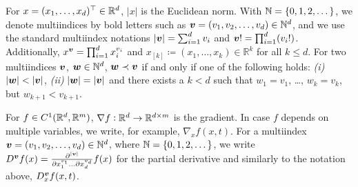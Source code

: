   For $x=(x_1,\dots,x_d)^\top\in\mathbb{R}^d$, $|x|$ is the Euclidean norm.
  With $\mathbb{N}=\{0,1,2,\dots\}$, we denote multiindices by bold letters
  such as ${\boldsymbol v} = (v_1,v_2,\dots,v_d) \in \mathbb{N}^d$, and we use the
  standard multiindex notations $|{\boldsymbol v}| = \sum_{i = 1}^d v_i$ and
  ${\boldsymbol v}! = \prod_{i=1}^d(v_i!)$.
  Additionally, $x^{\boldsymbol v} = \prod_{i=1}^d x_i^{v_i}$ and 
  $x_{[k]} \coloneqq (x_1,\dots,x_k)\in\mathbb{R}^k$ for all $k\leq d$.
  For two multiindices ${\boldsymbol v}$, ${\boldsymbol w}\in\mathbb{N}^d$, ${\boldsymbol w} \prec {\boldsymbol v}$ if and
  only if one of the following holds: \textit{(i)} $|{\boldsymbol w}| < |{\boldsymbol v}|$,
  \textit{(ii)} $|{\boldsymbol w}| = |{\boldsymbol v}|$ and there exists a $k < d$ such
  that $w_1 = v_1$, \dots, $w_k = v_k$, but $w_{k+1} < v_{k+1}$.


\medskip

   For $f\in C^1(\mathbb{R}^d,\mathbb{R}^m)$,
  $\nabla f:\mathbb{R}^d\to\mathbb{R}^{d\times m}$ is the gradient. In case $f$
  depends on multiple variables, we write, for example,
  $\nabla_xf(x,t)$. For a multiindex
  ${\boldsymbol v} = (v_1,v_2,\dots,v_d) \in \mathbb{N}^d$, where
  $\mathbb{N}=\{0,1,2,\dots\}$, we write
  $D^{\boldsymbol v} f(x)= \frac{\partial^{|{\boldsymbol v}|}}{\partial x_1^{v_1} \dots 
    \partial x_d^{v_d}} f(x)$ for the partial derivative and similarly to the notation above, $D_x^{\boldsymbol v} f(x,t)$.

